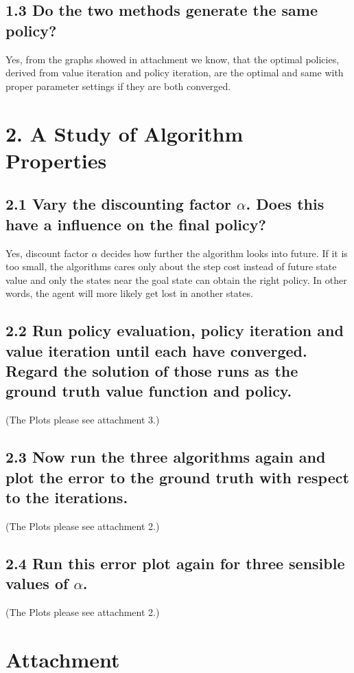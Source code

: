 \documentclass[12pt,a4paper,titlepage]{article}
\begin{document}
\subsection*{1.3 Do the two methods generate the same policy?}
Yes, from the graphs showed in attachment we know, that the optimal policies, derived from value iteration and policy iteration, are the optimal and same with proper parameter settings if they are both converged.

\section*{2. A Study of Algorithm Properties}
\subsection*{2.1 Vary the discounting factor $\alpha$. Does this have a influence on the final policy?}
Yes, discount factor $\alpha$ decides how further the algorithm looks into future. If it is too small, the algorithms cares only about the step cost instead of future state value and only the states near the goal state can obtain the right policy. In other words, the agent will more likely get lost in another states.
\subsection*{2.2 Run policy evaluation, policy iteration and value iteration until each have converged. Regard the solution of those runs as the ground truth value function and policy.}
(The Plots please see attachment 3.)
\subsection*{2.3 Now run the three algorithms again and plot the error to the ground truth with respect to the iterations.}
(The Plots please see attachment 2.)
\subsection*{2.4 Run this error plot again for three sensible values of $\alpha$.}
(The Plots please see attachment 2.)
\newpage
\section*{Attachment}
\end{document}
